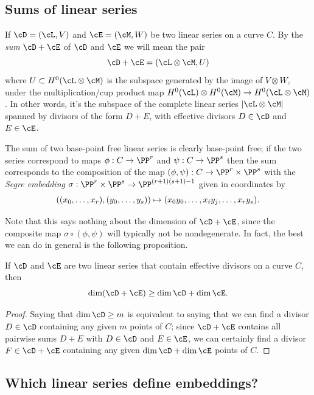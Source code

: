 \subsection*{Sums of linear series}
If
$\cD = (\cL,V)$ and $\cE = (\cM, W)$ be two linear series on a curve
$C$. By the
\emph{sum}
%
$\cD + \cE$ of $\cD$ and $\cE$
 we will mean the pair 
$$
\cD + \cE = (\cL \otimes \cM, U) 
$$
where $U \subset H^0(\cL \otimes \cM)$ is the subspace generated by
the image of $V \otimes W$, under the multiplication/cup product map
$H^0(\cL) \otimes H^0(\cM) \to H^0(\cL \otimes \cM)$. In other words,
it's the subspace of the complete linear series $|\cL\otimes \cM|$
spanned by divisors of the form $D+E$, with effective divisors $D \in
\cD$ and $E \in \cE$.
 
The sum of two base-point free linear series is clearly base-point free; if the two series correspond to maps
$\phi:C\to \PP^r$ and $\psi:C\to \PP^s$ then the sum corresponds to the composition of the map
$(\phi, \psi): C\to \PP^r\times \PP^s$ with the 
\emph{Segre embedding} 
% 
$\sigma : \PP^r\times \PP^s \to \PP^{(r+1)(s+1)-1}$
given in coordinates by
$$
((x_0,\dots, x_r), (y_0, \dots, y_s))\mapsto (x_0y_0, \dots, x_iy_j, \dots, x_ry_s).
\vspace*{-\parskip}
$$

Note that this says nothing about the dimension of $\cD + \cE$, since the composite map $\sigma \circ (\phi, \psi)$ will typically not be nondegenerate. In fact, the best we can do in general is the following proposition.


\begin{proposition}\label{sum of linear series}
 If $\cD$ and $\cE$ are two  linear series that contain effective divisors on a curve $C$, then
$$
\dim(\cD + \cE) \geq \dim \cD + \dim \cE.
\vspace*{-\parskip}
$$
\end{proposition}

\begin{proof}
Saying that
$\dim \cD \geq m$ is equivalent to saying that we can find a divisor
$D \in \cD$ containing any given $m$ points of $C$; since $\cD + \cE$
contains all pairwise sums $D + E$ with $D \in \cD$ and $E \in \cE$,
we can certainly find a divisor $F \in \cD + \cE$ containing any given
$\dim \cD + \dim \cE$ points of $C$. 
\end{proof}

\subsection*{Which linear series define embeddings?}

